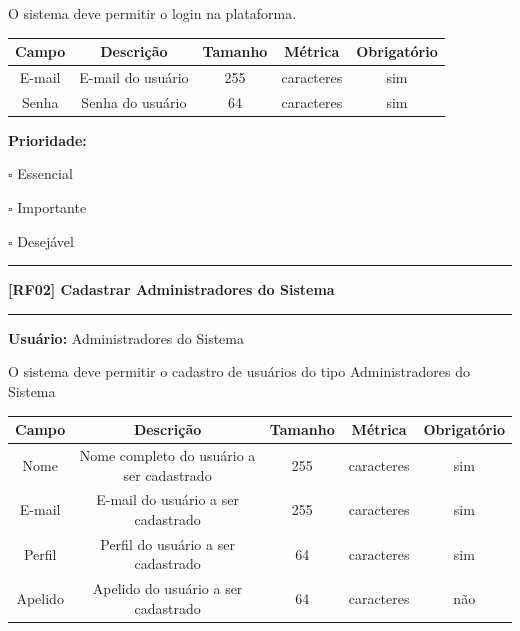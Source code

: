 \documentclass{scrreprt}
\begin{document}
	O sistema deve permitir o login na plataforma.
	
	\begin{center}
		\begin{adjustbox}{width=\textwidth}      \begin{tabular}{ |c|c|c|c|c| } 
			\hline
			\rowcolor{lightgray} Campo & Descrição & Tamanho & Métrica & Obrigatório \\
			\hline
			E-mail & E-mail do usuário  & 255 & caracteres & sim \\ 
			\hline
			Senha & Senha do usuário & 64 & caracteres & sim \\
			\hline
		\end{tabular}    \end{adjustbox}
	\end{center}
	
	\textbf{Prioridade: }\begin{itemize*}
		\item[\hspace{1cm}\rlap{\raisebox{0.2ex}{\hspace{0.4ex}\scriptsize \ding{56}}}$\square$]
		Essencial
		\item[\hspace{1cm}$\square$]
		Importante
		\item[\hspace{1cm}$\square$]
		Desejável
	\end{itemize*}
	\begin{center}
		\noindent\rule{16cm}{0.4pt}
		\textbf{[RF02] Cadastrar Administradores do Sistema}
		\noindent\rule{16cm}{0.4pt}
	\end{center}
	\textbf{Usuário:} Administradores do Sistema
	
	O sistema deve permitir o cadastro de usuários do tipo Administradores do Sistema
	
	\begin{center}
		\begin{adjustbox}{width=\textwidth}      \begin{tabular}{ |c|c|c|c|c| } 
			\hline
			\rowcolor{lightgray} Campo & Descrição & Tamanho & Métrica & Obrigatório \\
			\hline
			Nome & Nome completo do usuário a ser cadastrado & 255 & caracteres & sim \\ 
			\hline
			E-mail & E-mail do usuário a ser cadastrado & 255 & caracteres & sim \\ 
			\hline
			Perfil & Perfil do usuário a ser cadastrado & 64 & caracteres & sim \\ 
			\hline
			Apelido & Apelido do usuário a ser cadastrado & 64 & caracteres & não \\
			\hline
		\end{tabular}    \end{adjustbox}
	\end{center}
	
\end{document}
